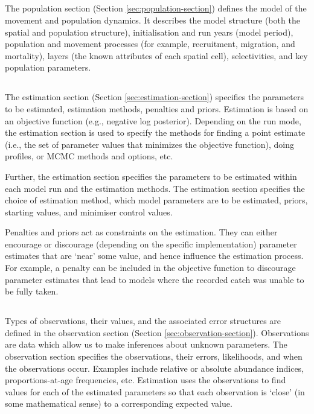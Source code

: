 \subsection{}

The population section (Section \ref{sec:population-section}) defines the model of the movement and population dynamics. It describes the model structure (both the spatial and population structure), initialisation and run years (model period), population and movement processes (for example, recruitment, migration, and mortality), layers (the known attributes of each spatial cell), selectivities, and key population parameters.

\subsection{}

The estimation section (Section \ref{sec:estimation-section}) specifies the parameters to be estimated, estimation methods, penalties and priors. Estimation is based on an objective function (e.g., negative log posterior). Depending on the run mode, the estimation section is used to specify the methods for finding a point estimate (i.e., the set of parameter values that minimizes the objective function), doing profiles, or MCMC methods and options, etc.

Further, the estimation section specifies the parameters to be estimated within each model run and the estimation methods. The estimation section specifies the choice of estimation method, which model parameters are to be estimated, priors, starting values, and minimiser control values.

Penalties and priors act as constraints on the estimation. They can either encourage or discourage (depending on the specific implementation) parameter estimates that are `near' some value, and hence influence the estimation process. For example, a penalty can be included in the objective function to discourage parameter estimates that lead to models where the recorded catch was unable to be fully taken.

\subsection{}

Types of observations, their values, and the associated error structures are defined in the observation section (Section \ref{sec:observation-section}). Observations are data which allow us to make inferences about unknown parameters. The observation section specifies the observations, their errors, likelihoods, and when the observations occur. Examples include relative or absolute abundance indices, proportions-at-age frequencies, etc. Estimation uses the observations to find values for each of the estimated parameters so that each observation is `close' (in some mathematical sense) to a corresponding expected value. 

